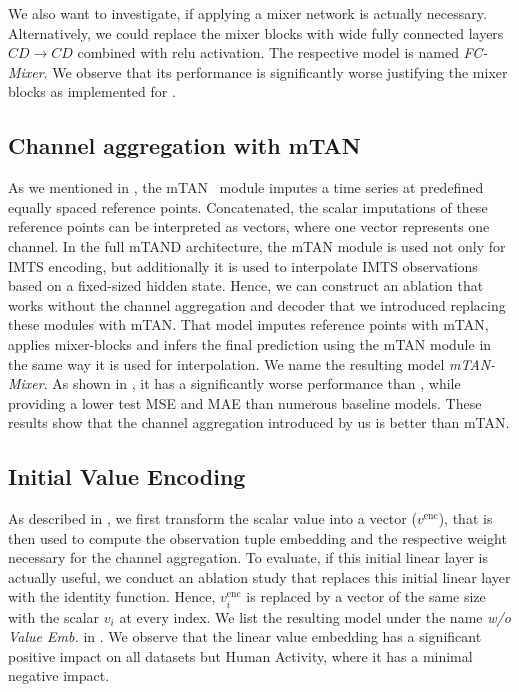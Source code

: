 We also want to investigate, if applying a mixer network is actually necessary. 
Alternatively, we could replace the mixer blocks with wide fully connected layers $CD \to CD$ combined with relu activation. 
The respective model is named \emph{FC-Mixer}. 
We observe that its performance is significantly worse justifying the mixer blocks as implemented for \model{}. 

\subsection{Channel aggregation with mTAN}
As we mentioned in , the mTAN~\cite{Shukla2020.MultiTime} module imputes a time series at predefined equally spaced reference points. 
Concatenated, the scalar imputations of these reference points can be interpreted as vectors, where one vector represents one channel.
In the full mTAND architecture, the mTAN module is used not only for IMTS encoding, but additionally it is used to interpolate IMTS observations based on a fixed-sized hidden state. 
Hence, we can construct an ablation that works without the channel aggregation and decoder that we introduced replacing these modules with mTAN.\@
That model imputes reference points with mTAN, applies mixer-blocks and infers the final prediction using the mTAN module in the same way it is used for interpolation. 
We name the resulting model \emph{mTAN-Mixer}. 
As shown in , it has a significantly worse performance than \model{}, while providing a lower test MSE and MAE than numerous baseline models. 
These results show that the channel aggregation introduced by us is better than mTAN.\@

\subsection{Initial Value Encoding}
As described in , we first transform the scalar value into a vector ($v^{\text{enc}}$), that is then used to compute the observation tuple embedding and the respective weight necessary for the channel aggregation. 
To evaluate, if this initial linear layer is actually useful, we conduct an ablation study that replaces this initial linear layer with the identity function.
Hence, $v^{\text{enc}}_i$ is replaced by a vector of the same size with the scalar $v_i$ at every index. 
We list the resulting model under the name \emph{w/o Value Emb.} in .
We observe that the linear value embedding has a significant positive impact on all datasets but Human Activity, where it has a minimal negative impact. 

